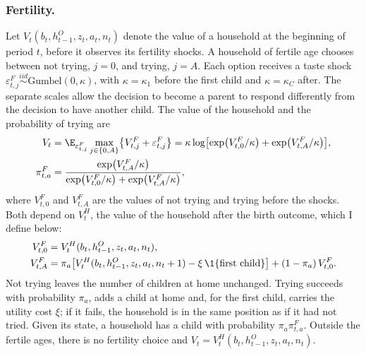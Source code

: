 \subsubsection*{Fertility.}
Let $V_t(b_t,h^O_{t-1},z_t,a_t,n_t)$ denote the value of a household at the
beginning of period $t$, before it observes its fertility shocks. A household
of fertile age chooses between not trying, $j=0$, and trying, $j=A$. Each
option receives a taste shock
$\varepsilon^F_{t,j}\overset{iid}{\sim}\text{Gumbel}(0,\kappa)$, with
$\kappa=\kappa_1$ before the first child and $\kappa=\kappa_C$ after. The
separate scales allow the decision to become a parent to respond differently
from the decision to have another child. The value of the household and the
probability of trying are
\begin{equation}
\begin{aligned}
 V_t&=\E_{\varepsilon^F_{t,j}}\max_{j\in\{0,A\}}\bigl\{V^F_{t,j}+\varepsilon^F_{t,j}\bigr\}
 =\kappa\log\bigl[\exp\bigl(V^F_{t,0}/\kappa\bigr)+\exp\bigl(V^F_{t,A}/\kappa\bigr)\bigr],\\
 \pi^F_{t,a}&=\frac{\exp\bigl(V^F_{t,A}/\kappa\bigr)}{\exp\bigl(V^F_{t,0}/\kappa\bigr)+\exp\bigl(V^F_{t,A}/\kappa\bigr)},
\end{aligned}
 \label{eq:m-fertility}
\end{equation}
where $V^F_{t,0}$ and $V^F_{t,A}$ are the values of not trying and trying
before the shocks. Both depend on $V^H_t$, the value of the household after the
birth outcome, which I define below:
\begin{equation*}
\begin{aligned}
 V^F_{t,0}&=V^H_t(b_t,h^O_{t-1},z_t,a_t,n_t),\\
 V^F_{t,A}&=\pi_a\bigl[V^H_t(b_t,h^O_{t-1},z_t,a_t,n_t+1)-\xi\,\1\{\text{first child}\}\bigr]+(1-\pi_a)\,V^F_{t,0}.
\end{aligned}
\end{equation*}
Not trying leaves the number of children at home unchanged. Trying succeeds
with probability $\pi_a$, adds a child at home and, for the first child,
carries the utility cost $\xi$; if it fails, the household is in the same
position as if it had not tried. Given its state, a household has a child
with probability $\pi_a\pi^F_{t,a}$. Outside the fertile ages, there is no
fertility choice and $V_t=V^H_t(b_t,h^O_{t-1},z_t,a_t,n_t)$.

